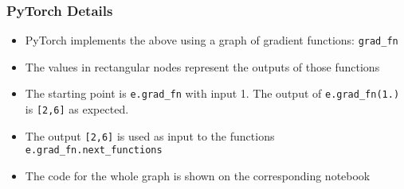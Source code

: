\documentclass{beamer}
\theoremstyle{plain} %
\theoremstyle{example} %
\begin{document}
\begin{frame}
    \frametitle{PyTorch Details}
\begin{itemize}
    \item PyTorch implements the above using a graph of gradient functions: \lstinline{grad_fn}
    \item The values in rectangular nodes represent the outputs of those functions
    \item  The starting point is \lstinline{e.grad_fn} with input 1. The output of \lstinline{e.grad_fn(1.)} is \lstinline{[2,6]} as expected.
    \item The output \lstinline{[2,6]} is used as input to the functions \lstinline{e.grad_fn.next_functions}
    \item The code for the whole graph is shown on the corresponding notebook
\end{itemize}
\end{frame}
\end{document}
